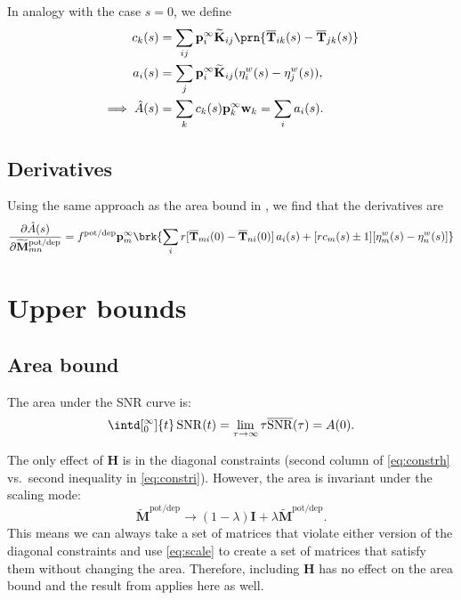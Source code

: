 \documentclass[12pt]{article}
\newcommand{\I}{\mathbf{I}}
\newcommand{\pr}{\mathbf{p}}
\newcommand{\eq}{\pr^\infty}
\newcommand{\fpt}{\mathbf{T}}
\newcommand{\fptb}{\overline{\fpt}}
\newcommand{\w}{\mathbf{w}}
\newcommand{\M}{\mathbf{M}}
\newcommand{\enc}{\mathbf{K}}
\newcommand{\potdep}{^{\text{pot/dep}}}
\renewcommand{\hom}{\mathbf{H}}
\newcommand{\Mh}{\widetilde{\M}}
\newcommand{\ench}{\widetilde{\enc}}
\DeclareMathOperator{\snr}{SNR}
\newcommand{\snrb}{\overline{\snr}}
\renewcommand{\pdiff}[2]{\frac{\partial #1}{\partial #2}}
\begin{document}
In analogy with the case $s=0$, we define
%
\begin{equation}\label{eq:lareacoeffs}
  \begin{aligned}
    c_k(s) &= \sum_{ij} \eq_i \ench_{ij} \prn{\fptb_{ik}(s)-\fptb_{jk}(s)} \\
    a_i(s) &= \sum_j \eq_i \ench_{ij} (\eta^w_{i}(s) - \eta^w_{j}(s)),\\
    \implies
    \hat{A}(s) &= \sum_k c_k(s) \eq_k \w_k
      = \sum_i a_i(s).
  \end{aligned}
\end{equation}
%

\subsection{Derivatives}\label{sec:lderiv}

Using the same approach as the area bound in \cite{Lahiri2013synapse}, we find that the derivatives are
%
\begin{equation}\label{eq:lAdiff}
  \pdiff{\hat{A}(s)}{\Mh\potdep_{mn}}
     = f\potdep \eq_m \brk{ \sum_i r[\fptb_{mi}(0)-\fptb_{ni}(0)]\, a_i(s)
     +[rc_m(s) \pm 1] [\eta^w_m(s) - \eta^w_n(s)] } 
\end{equation}
%





\section{Upper bounds}\label{sec:upperbnds}



\subsection{Area bound}\label{sec:area}

The area under the SNR curve is:
%
\begin{equation}\label{eq:areadef}
  \intd[_0^\infty]{t} \snr(t) = \lim_{\tau\to\infty} \tau \snrb(\tau) = A(0).
\end{equation}
%

The only effect of $\hom$ is in the diagonal constraints (second column of \eqref{eq:constrh} vs.\ second inequality in \eqref{eq:constri}).
However, the area is invariant under the scaling mode:
%
\begin{equation}\label{eq:scale}
  \Mh\potdep  \to (1-\lambda)\I + \lambda \Mh\potdep .
\end{equation}
%
This means we can always take a set of matrices that violate either version of the diagonal constraints and use \eqref{eq:scale} to create a set of matrices that satisfy them without changing the area.
Therefore, including $\hom$ has no effect on the area bound and the result from \cite{Lahiri2013synapse} applies here as well.
\end{document}
